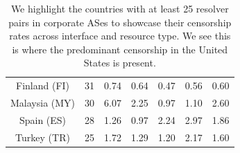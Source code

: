 {\begin{table}[t]
{\begin{tabular}{ccccccc}
                Finland (FI) & 31 & 0.74 & 0.64 & 0.47 & 0.56 & 0.60\\
                Malaysia (MY) & 30 & 6.07 & 2.25 & 0.97 & 1.10 & 2.60\\
                Spain (ES) & 28 & 1.26 & 0.97 & 2.24 & 2.97 & 1.86\\
                Turkey (TR) & 25 & 1.72 & 1.29 & 1.20 & 2.17 & 1.60\\
                \bottomrule
            \end{tabular}} 
            \caption{
                We highlight the countries with at least 25 resolver pairs in
                corporate ASes to showcase their censorship rates across
                interface and resource type. We see this is where the
                predominant censorship in the United States is present. 
            }
            \label{tab:small-countries-corporate}
    \end{table}
}


\newcommand{\IranRecursionTable}{
\begin{table}[h!]
    \begin{center}
        \begin{tabular}{l|c|c|c} %
                  & \textbf{V4} & \textbf{V6} & \textbf{6to4}         \\
            \hline
            RD    & 10.10.34.35 & d0::11      & 10.10.34.35           \\
            No RD & 10.10.34.35 & d0::11      & \textbf{no injection} \\
        \end{tabular}
    \end{center}
    \caption{The Iranian censor provides distinctive injections to queries sent
        over both v4 and v6, but fails to inject responses for queries to
        resolvers using 6to4 addresses when the query excludes the recursion
        desired flag.}
    \label{tab:iran-recursion-table}
\end{table}
}

